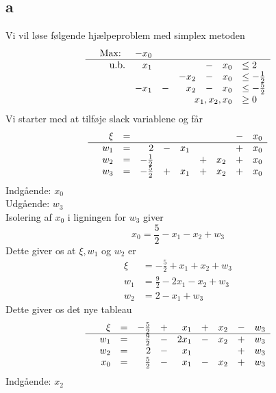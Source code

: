 \documentclass[a4paper]{article}
\begin{document}
\subsection*{a}
Vi vil løse følgende hjælpeproblem med simplex metoden
\begin{equation}
\begin{array}{rrrrrrrl}
&\text{Max: } & -x_0 & & & & & \\
\hline
&\text{u.b.} &x_1 & & &- &x_0 &\leq 2 \\
& & & &-x_2 &- &x_0 &\leq -\frac{1}{2} \\
& &-x_1 &- &x_2 &- &x_0 &\leq -\frac{5}{2} \\
& & & &  \multicolumn{3}{r} {x_1,x_2,x_0} &\geq 0
\end{array}
\end{equation}
Vi starter med at tilføje slack variablene og får
\begin{equation}
\begin{array}{rrrrrrrrrl}
&\xi &= & & & & & & -&x_0 \\
\hline
&w_1 &= &2 &- &x_1 & & &+ &x_0 \\
&w_2 &= &-\frac{1}{2} & & &+ &x_2 &+ &x_0 \\
&w_3 &= &-\frac{5}{2} &+ &x_1 &+ &x_2 &+ &x_0 \\
\end{array}
\end{equation}
Indgående: $x_0$ \\
Udgående: $w_3$ \\
Isolering af $x_0$ i ligningen for $w_3$ giver
$$x_0=\frac{5}{2}-x_1-x_2+w_3$$
Dette giver os at $\xi,w_1$ og $w_2$ er
\begin{align*}
\xi&=-\frac{5}{2}+x_1+x_2+w_3 \\
w_1&=\frac{9}{2}-2x_1-x_2+w_3 \\
w_2&=2-x_1+w_3
\end{align*}
Dette giver os det nye tableau
\begin{equation}
\begin{array}{rrrrrrrrrl}
&\xi &= &-\frac{5}{2}&+&x_1&+&x_2&-&w_3\\
\hline
&w_1 &= &\frac{9}{2} &- &2x_1 &- &x_2 &+ &w_3 \\
&w_2 &= &2 &- &x_1 & & &+ &w_3 \\
&x_0 &= &\frac{5}{2} &- &x_1 &- &x_2 &+ &w_3 \\
\end{array}
\end{equation}
Indgående: $x_2$ \\
\end{document}
